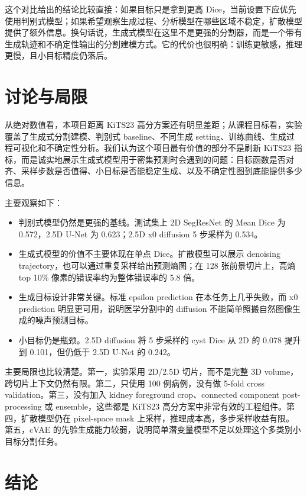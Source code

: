 \documentclass[lang=cn,11pt,a4paper]{elegantpaper}
\begin{document}
这个对比给出的结论比较直接：如果目标只是拿到更高 Dice，当前设置下应优先使用判别式模型；如果希望观察生成过程、分析模型在哪些区域不稳定，扩散模型提供了额外信息。换句话说，生成式模型在这里不是更强的分割器，而是一个带有生成轨迹和不确定性输出的分割建模方式。它的代价也很明确：训练更敏感，推理更慢，且小目标精度仍落后。

\section{讨论与局限}

从绝对数值看，本项目距离 KiTS23 高分方案还有明显差距；从课程目标看，实验覆盖了生成式分割建模、判别式 baseline、不同生成 setting、训练曲线、生成过程可视化和不确定性分析。我们认为这个项目最有价值的部分不是刷新 KiTS23 指标，而是诚实地展示生成式模型用于密集预测时会遇到的问题：目标函数是否对齐、采样步数是否值得、小目标是否能稳定生成、以及不确定性图到底能提供多少信息。

主要观察如下：
\begin{itemize}
    \item 判别式模型仍然是更强的基线。测试集上 2D SegResNet 的 Mean Dice 为 0.572，2.5D U-Net 为 0.623；2.5D x0 diffusion 5 步采样为 0.534。
    \item 生成式模型的价值不主要体现在单点 Dice。扩散模型可以展示 denoising trajectory，也可以通过重复采样给出预测熵图；在 128 张前景切片上，高熵 top 10\% 像素的错误率约为整体错误率的 5.8 倍。
    \item 生成目标设计非常关键。标准 epsilon prediction 在本任务上几乎失败，而 x0 prediction 明显更可用，说明医学分割中的 diffusion 不能简单照搬自然图像生成的噪声预测目标。
    \item 小目标仍是瓶颈。2.5D diffusion 将 5 步采样的 cyst Dice 从 2D 的 0.078 提升到 0.101，但仍低于 2.5D U-Net 的 0.242。
\end{itemize}

主要局限也比较清楚。第一，实验采用 2D/2.5D 切片，而不是完整 3D volume，跨切片上下文仍然有限。第二，只使用 100 例病例，没有做 5-fold cross validation。第三，没有加入 kidney foreground crop、connected component post-processing 或 ensemble，这些都是 KiTS23 高分方案中非常有效的工程组件。第四，扩散模型仍在 pixel-space mask 上采样，推理成本高，多步采样收益有限。第五，cVAE 的先验生成能力较弱，说明简单潜变量模型不足以处理这个多类别小目标分割任务。


\section{结论}
\end{document}
